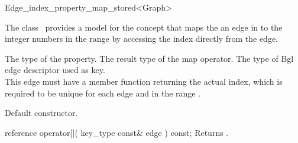

\begin{ccRefClass}{Edge_index_property_map_stored<Graph>}


\ccDefinition

The class \ccRefName\ provides a model for the concept 
that maps the an edge in 
to the integer numbers in the range
by accessing the index directly from the edge.


\ccTypes
    {The type of the property.}
\ccGlue
    {The result type of the map operator.}
\ccGlue
\ccGlue
  {The type of {\sc Bgl} edge descriptor used as key.\\
   This edge must have a member function 
   returning the actual index, which is required to be unique for each edge
   and in the range .
  }

\ccCreation
{}  %

{Default constructor.}

\ccOperations

\ccMethod
  {reference operator[]( key_type const& edge ) const;}
  {Returns .}  
    
\ccIsModel
{}

\ccSeeAlso
{}\\

\end{ccRefClass}


